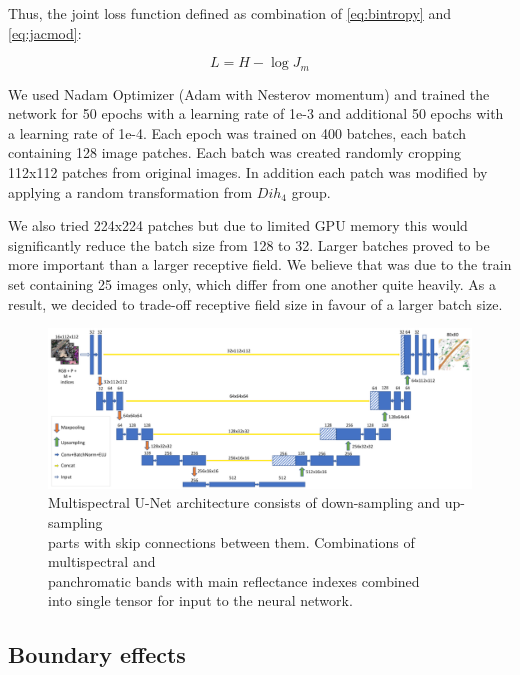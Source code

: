 \documentclass[10pt,twocolumn,letterpaper]{article}
\begin{document}
Thus, the joint loss function defined as combination of \ref{eq:bintropy} and \ref{eq:jacmod}:

\begin{equation}
L = H - \log J_{m}
\end{equation}

We used Nadam Optimizer (Adam with Nesterov momentum) \cite{nadam} and trained the network for 50 epochs with a learning rate of 1e-3 and additional 50 epochs with a learning rate of 1e-4. Each epoch was trained on 400 batches, each batch containing 128 image patches. Each batch was created randomly cropping 112x112 patches from original images. In addition each patch was modified by applying a random transformation from $Dih_4$ group.

We also tried 224x224 patches but due to limited GPU memory this would significantly reduce the batch size from 128 to 32. Larger batches proved to be more important than a larger receptive field. We believe that was due to the train set containing 25 images only, which differ from one another quite heavily. As a result, we decided to trade-off receptive field size in favour of a larger batch size.

\begin{figure}[th]
	\centering
	\includegraphics[scale=0.265]{unet}
	\captionsetup{justification=centering}
	\caption{Multispectral U-Net architecture consists of down-sampling and up-sampling \\ parts with skip connections between them.  Combinations of multispectral and \\ panchromatic bands with main reflectance indexes combined \\ into single tensor for input to the neural network. }
	\label{fig:unet}
\end{figure}

\subsection{Boundary effects}
\end{document}
